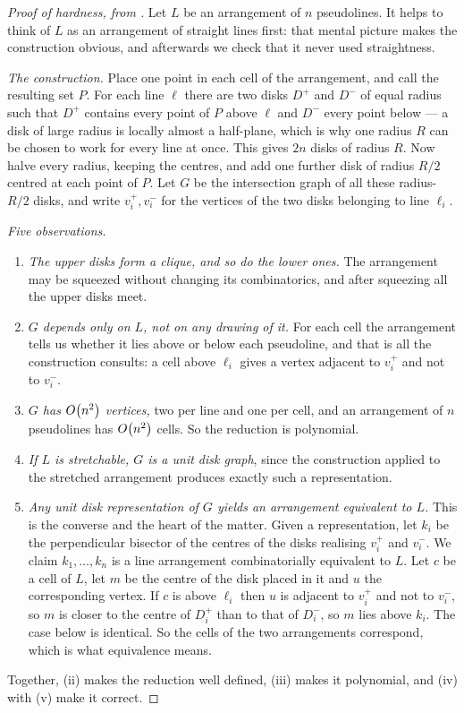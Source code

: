 \begin{proof}[Proof of hardness, from ]
Let $L$ be an arrangement of $n$ pseudolines. It helps to think of $L$ as an
arrangement of straight lines first: that mental picture makes the construction
obvious, and afterwards we check that it never used straightness.

\emph{The construction.} Place one point in each cell of the arrangement, and
call the resulting set $P$. For each line $\ell$ there are two disks $D^{+}$
and $D^{-}$ of equal radius such that $D^{+}$ contains every point of $P$ above
$\ell$ and $D^{-}$ every point below --- a disk of large radius is locally
almost a half-plane, which is why one radius $R$ can be chosen to work for every
line at once. This gives $2n$ disks of radius $R$. Now halve every radius,
keeping the centres, and add one further disk of radius $R/2$ centred at each
point of $P$. Let $G$ be the intersection graph of all these radius-$R/2$
disks, and write $v_i^{+}, v_i^{-}$ for the vertices of the two disks belonging
to line $\ell_i$.

\emph{Five observations.}
\begin{enumerate}[label=(\roman*),leftmargin=*]
  \item \emph{The upper disks form a clique, and so do the lower ones.} The
        arrangement may be squeezed without changing its combinatorics, and
        after squeezing all the upper disks meet.
  \item \emph{$G$ depends only on $L$, not on any drawing of it.} For each cell
        the arrangement tells us whether it lies above or below each pseudoline,
        and that is all the construction consults: a cell above $\ell_i$ gives a
        vertex adjacent to $v_i^{+}$ and not to $v_i^{-}$.
  \item \emph{$G$ has $O\!\left(n^2\right)$ vertices,} two per line and one per cell,
        and an arrangement of $n$ pseudolines has $O\!\left(n^2\right)$ cells. So the
        reduction is polynomial.
  \item \emph{If $L$ is stretchable, $G$ is a unit disk graph}, since the
        construction applied to the stretched arrangement produces exactly such
        a representation.
  \item \emph{Any unit disk representation of $G$ yields an arrangement
        equivalent to $L$.} This is the converse and the heart of the matter.
        Given a representation, let $k_i$ be the perpendicular bisector of the
        centres of the disks realising $v_i^{+}$ and $v_i^{-}$. We claim
        $k_1, \ldots, k_n$ is a line arrangement combinatorially equivalent to
        $L$. Let $c$ be a cell of $L$, let $m$ be the centre of the disk placed
        in it and $u$ the corresponding vertex. If $c$ is above $\ell_i$ then
        $u$ is adjacent to $v_i^{+}$ and not to $v_i^{-}$, so $m$ is closer to
        the centre of $D_i^{+}$ than to that of $D_i^{-}$, so $m$ lies above
        $k_i$. The case below is identical. So the cells of the two
        arrangements correspond, which is what equivalence means.
\end{enumerate}
Together, (ii) makes the reduction well defined, (iii) makes it polynomial, and
(iv) with (v) make it correct.
\end{proof}

